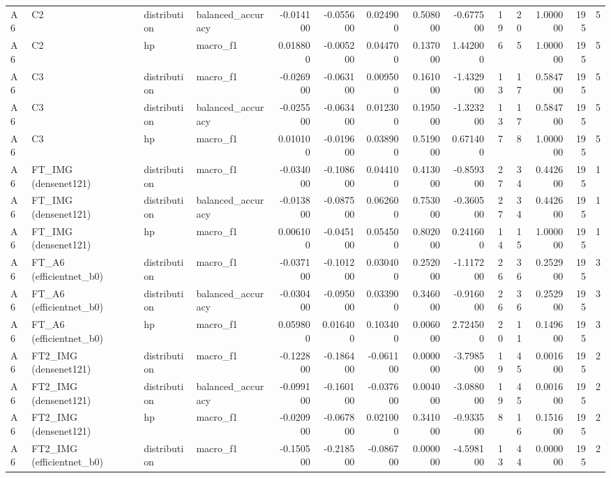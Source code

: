 \begin{table}
\begin{tabular}{llllrrrrrrrrrr}
A6 & C2 & distribution & balanced\_accuracy & -0.014100 & -0.055600 & 0.024900 & 0.508000 & -0.677500 & 19 & 20 & 1.000000 & 195 & 5 \\
A6 & C2 & hp & macro\_f1 & 0.018800 & -0.005200 & 0.044700 & 0.137000 & 1.442000 & 6 & 5 & 1.000000 & 195 & 5 \\
A6 & C3 & distribution & macro\_f1 & -0.026900 & -0.063100 & 0.009500 & 0.161000 & -1.432900 & 13 & 17 & 0.584700 & 195 & 5 \\
A6 & C3 & distribution & balanced\_accuracy & -0.025500 & -0.063400 & 0.012300 & 0.195000 & -1.323200 & 13 & 17 & 0.584700 & 195 & 5 \\
A6 & C3 & hp & macro\_f1 & 0.010100 & -0.019600 & 0.038900 & 0.519000 & 0.671400 & 7 & 8 & 1.000000 & 195 & 5 \\
A6 & FT\_IMG (densenet121) & distribution & macro\_f1 & -0.034000 & -0.108600 & 0.044100 & 0.413000 & -0.859300 & 27 & 34 & 0.442600 & 195 & 1 \\
A6 & FT\_IMG (densenet121) & distribution & balanced\_accuracy & -0.013800 & -0.087500 & 0.062600 & 0.753000 & -0.360500 & 27 & 34 & 0.442600 & 195 & 1 \\
A6 & FT\_IMG (densenet121) & hp & macro\_f1 & 0.006100 & -0.045100 & 0.054500 & 0.802000 & 0.241600 & 14 & 15 & 1.000000 & 195 & 1 \\
A6 & FT\_A6 (efficientnet\_b0) & distribution & macro\_f1 & -0.037100 & -0.101200 & 0.030400 & 0.252000 & -1.117200 & 26 & 36 & 0.252900 & 195 & 3 \\
A6 & FT\_A6 (efficientnet\_b0) & distribution & balanced\_accuracy & -0.030400 & -0.095000 & 0.033900 & 0.346000 & -0.916000 & 26 & 36 & 0.252900 & 195 & 3 \\
A6 & FT\_A6 (efficientnet\_b0) & hp & macro\_f1 & 0.059800 & 0.016400 & 0.103400 & 0.006000 & 2.724500 & 20 & 11 & 0.149600 & 195 & 3 \\
A6 & FT2\_IMG (densenet121) & distribution & macro\_f1 & -0.122800 & -0.186400 & -0.061100 & 0.000000 & -3.798500 & 19 & 45 & 0.001600 & 195 & 2 \\
A6 & FT2\_IMG (densenet121) & distribution & balanced\_accuracy & -0.099100 & -0.160100 & -0.037600 & 0.004000 & -3.088000 & 19 & 45 & 0.001600 & 195 & 2 \\
A6 & FT2\_IMG (densenet121) & hp & macro\_f1 & -0.020900 & -0.067800 & 0.021000 & 0.341000 & -0.933500 & 8 & 16 & 0.151600 & 195 & 2 \\
A6 & FT2\_IMG (efficientnet\_b0) & distribution & macro\_f1 & -0.150500 & -0.218500 & -0.086700 & 0.000000 & -4.598100 & 13 & 44 & 0.000000 & 195 & 2 \\

\end{tabular}
\end{table}
